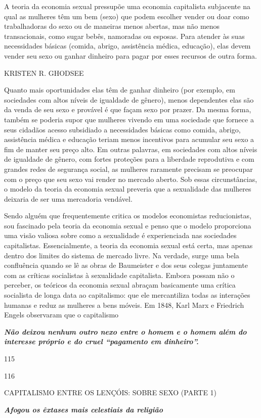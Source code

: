  \par 
A teoria da economia sexual pressupõe uma economia capitalista subjacente na qual as mulheres têm um bem (sexo) que podem escolher vender ou doar como trabalhadoras do sexo ou de maneiras menos abertas, mas não menos transacionais, como sugar bebês, namoradas ou esposas. Para atender às suas necessidades básicas (comida, abrigo, assistência médica, educação), elas devem vender seu sexo ou ganhar dinheiro para pagar por esses recursos de outra forma.
 \par 
KRISTEN R. GHODSEE
 \par 
Quanto mais oportunidades elas têm de ganhar dinheiro (por exemplo, em sociedades com altos níveis de igualdade de gênero), menos dependentes elas são da venda de seu sexo e provável é que façam sexo por prazer. Da mesma forma, também se poderia supor que mulheres vivendo em uma sociedade que fornece a seus cidadãos acesso subsidiado a necessidades básicas como comida, abrigo, assistência médica e educação teriam menos incentivos para acumular seu sexo a fim de manter seu preço alto. Em outras palavras, em sociedades com altos níveis de igualdade de gênero, com fortes proteções para a liberdade reprodutiva e com grandes redes de segurança social, as mulheres raramente precisam se preocupar com o preço que seu sexo vai render no mercado aberto. Sob essas circunstâncias, o modelo da teoria da economia sexual preveria que a sexualidade das mulheres deixaria de ser uma mercadoria vendável.
 \par 
Sendo alguém que frequentemente critica os modelos economistas reducionistas, sou fascinado pela teoria da economia sexual e penso que o modelo proporciona uma visão valiosa sobre como a sexualidade é experienciada nas sociedades capitalistas. Essencialmente, a teoria da economia sexual está certa, mas apenas dentro dos limites do sistema de mercado livre. Na verdade, surge uma bela confluência quando se lê as obras de Baumeister e dos seus colegas juntamente com as críticas socialistas à sexualidade capitalista. Embora possam não o perceber, os teóricos da economia sexual abraçam basicamente uma crítica socialista de longa data ao capitalismo: que ele mercantiliza todas as interações humanas e reduz as mulheres a bens móveis. Em 1848, Karl Marx e Friedrich Engels observaram que o capitalismo
 \par 
\textit\textbf{ {Não deixou nenhum outro nexo entre o homem e o homem além do interesse próprio e do cruel “pagamento em dinheiro”.} }
 \par 
115
 \par 
116
 \par 
CAPITALISMO ENTRE OS LENÇÓIS: SOBRE SEXO (PARTE {\color{blue}1})
 \par 
\textit\textbf{ {Afogou os êxtases mais celestiais da religião} }
 \par 
